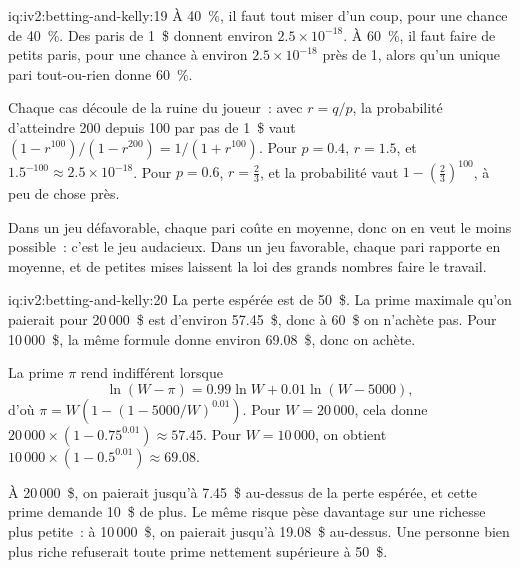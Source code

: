 \begin{solution}{iq:iv2:betting-and-kelly:19}
À 40~\%, il faut tout miser d'un coup, pour une chance de 40~\%. Des paris de 1~\$ donnent environ $2.5 \times 10^{-18}$. À 60~\%, il faut faire de petits paris, pour une chance à environ $2.5 \times 10^{-18}$ près de 1, alors qu'un unique pari tout-ou-rien donne 60~\%.

Chaque cas découle de la ruine du joueur~: avec $r = q/p$, la probabilité d'atteindre 200 depuis 100 par pas de 1~\$ vaut $(1 - r^{100})/(1 - r^{200}) = 1/(1 + r^{100})$. Pour $p = 0.4$, $r = 1.5$, et $1.5^{-100} \approx 2.5 \times 10^{-18}$. Pour $p = 0.6$, $r = \tfrac23$, et la probabilité vaut $1 - (\tfrac23)^{100}$, à peu de chose près.

Dans un jeu défavorable, chaque pari coûte en moyenne, donc on en veut le moins possible~: c'est le jeu audacieux. Dans un jeu favorable, chaque pari rapporte en moyenne, et de petites mises laissent la loi des grands nombres faire le travail.

\end{solution}

\begin{solution}{iq:iv2:betting-and-kelly:20}
La perte espérée est de 50~\$. La prime maximale qu'on paierait pour 20\,000~\$ est d'environ 57.45~\$, donc à 60~\$ on n'achète pas. Pour 10\,000~\$, la même formule donne environ 69.08~\$, donc on achète.

La prime $\pi$ rend indifférent lorsque
\[
\ln(W - \pi) = 0.99\ln W + 0.01\ln(W - 5000),
\]
d'où $\pi = W\left(1 - (1 - 5000/W)^{0.01}\right)$. Pour $W = 20\,000$, cela donne $20\,000 \times (1 - 0.75^{0.01}) \approx 57.45$. Pour $W = 10\,000$, on obtient $10\,000 \times (1 - 0.5^{0.01}) \approx 69.08$.

À 20\,000~\$, on paierait jusqu'à 7.45~\$ au-dessus de la perte espérée, et cette prime demande 10~\$ de plus. Le même risque pèse davantage sur une richesse plus petite~: à 10\,000~\$, on paierait jusqu'à 19.08~\$ au-dessus. Une personne bien plus riche refuserait toute prime nettement supérieure à 50~\$.

\end{solution}


